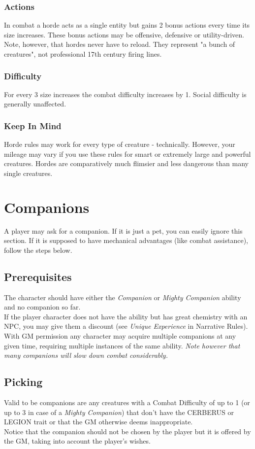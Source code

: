 \documentclass[12pt,a4paper,openany,usenames,dvipsnames]{book}
\begin{document}
	\subsection*{Actions}
	In combat a horde acts as a single entity but gains 2 bonus actions every time its size increases. These bonus actions may be offensive, defensive or utility-driven. \\
	Note, however, that hordes never have to reload. They represent "a bunch of creatures", not professional 17th century firing lines.
	
	\subsection*{Difficulty}
	For every 3 size increases the combat difficulty increases by 1. Social difficulty is generally unaffected.
	
	\subsection*{Keep In Mind}
	Horde rules may work for every type of creature - technically. However, your mileage may vary if you use these rules for smart or extremely large and powerful creatures. Hordes are comparatively much flimsier and less dangerous than many single creatures.
	
	
	\chapter{Companions}
	A player may ask for a companion. If it is just a pet, you can easily ignore this section. If it is supposed to have mechanical advantages (like combat assistance), follow the steps below.
	\section{Prerequisites}
	The character should have either the \textit{Companion} or \textit{Mighty Companion} ability and no companion so far.\\
	If the player character does not have the ability but has great chemistry with an NPC, you may give them a discount (see \textit{Unique Experience} in Narrative Rules).\\
	With GM permission any character may acquire multiple companions at any given time,
		requiring multiple instances of the same ability.
	\textit{Note however that many companions will slow down combat considerably.}
	\section{Picking}
	Valid to be companions are any creatures with a Combat Difficulty of up to 1 (or up to 3 in case of a \textit{Mighty Companion}) that don't have the CERBERUS or LEGION trait or that the GM otherwise deems inappropriate.\\
	Notice that the companion should not be chosen by the player but it is offered by the GM, taking into account the player's wishes.
\end{document}
